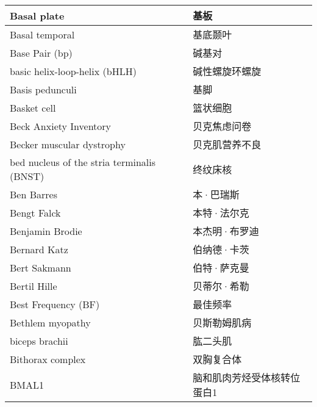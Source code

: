 \begin{longtable}{lll}
	\midrule
	Basal plate   && 基板  \\
	
	\midrule
	Basal temporal   && 基底颞叶  \\
	
	\midrule
	Base Pair (bp)  && 碱基对  \\
	
	\midrule
	basic helix-loop-helix (bHLH)  && 碱性螺旋环螺旋  \\
	
	\midrule
	Basis pedunculi   && 基脚  \\
	
	\midrule
	Basket cell   && 篮状细胞  \\
	
	\midrule
	Beck Anxiety Inventory   && 贝克焦虑问卷  \\
	
	\midrule
	Becker muscular dystrophy   && 贝克肌营养不良  \\
	
	\midrule
	bed nucleus of the stria terminalis (BNST)  && 终纹床核  \\
	
	\midrule
	Ben Barres   && 本·巴瑞斯  \\
	
	\midrule
	Bengt Falck   && 本特·法尔克  \\
	
	\midrule
	Benjamin Brodie   && 本杰明·布罗迪  \\
	
	\midrule
	Bernard Katz   && 伯纳德·卡茨  \\
	
	\midrule
	Bert Sakmann   && 伯特·萨克曼  \\
	
	\midrule
	Bertil Hille   && 贝蒂尔·希勒  \\
 
	\midrule
	Best Frequency (BF)     && 最佳频率   \\
	
	\midrule
	Bethlem myopathy     && 贝斯勒姆肌病   \\
	
	\midrule
	biceps brachii     && 	肱二头肌   \\
	
	\midrule
	Bithorax complex     && 	双胸复合体   \\
	
	\midrule
	BMAL1     && 	脑和肌肉芳烃受体核转位蛋白1   \\
	

\end{longtable}
